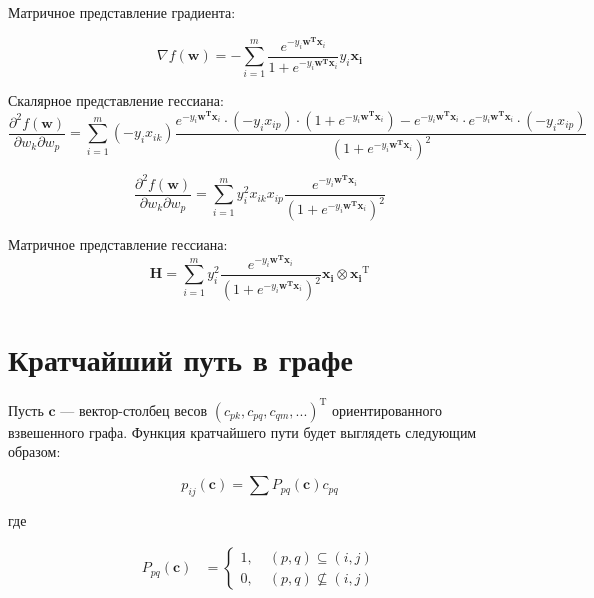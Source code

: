 	Матричное представление градиента:
	
	\begin{equation}
	\nabla f(\mathbf{w}) = - \sum\limits_{i=1}^m  \frac{e^{-y_i \mathbf{w^T
				x}_i}}{1+ e^{-y_i \mathbf{w^T x}_i}} y_i\mathbf{x_i}
	\end{equation}
	
	Скалярное представление гессиана:
	\begin{equation}
	\frac{\partial^2 f(\mathbf{w})}{\partial w_k \partial w_p} =
	\sum\limits_{i=1}^m (-y_i x_{ik})  \frac{e^{-y_i \mathbf{w^T x}_i}\cdot(-y_i
		x_{ip})\cdot(1+e^{-y_i \mathbf{w^T x}_i})-e^{-y_i \mathbf{w^T x}_i}\cdot e^{-y_i
			\mathbf{w^T x}_i}\cdot(-y_i x_{ip})}{(1+e^{-y_i \mathbf{w^T x}_i})^2} 
	\end{equation}
	
	\begin{equation}
	\frac{\partial^2 f(\mathbf{w})}{\partial w_k \partial w_p}= \sum\limits_{i=1}^m
	y_i^2 x_{ik} x_{ip} \frac{e^{-y_i \mathbf{w^T x}_i}}{(1+e^{-y_i \mathbf{w^T
				x}_i})^2}
	\end{equation}	
	
	Матричное представление гессиана:
	\begin{equation}
	\mathbf{H} = \sum\limits_{i=1}^m y_i^2  \frac{e^{-y_i \mathbf{w^T
				x}_i}}{(1+e^{-y_i \mathbf{w^T x}_i})^2} \mathbf{x_i} \otimes
	\mathbf{x_i}^\text{T}
	\end{equation}
	
	\section{Кратчайший путь в графе}
	
	Пусть $\mathbf{c}$ --- вектор-столбец весов $(c_{pk}, c_{pq}, c_{qm},
	...)^{\text{T}}$ ориентированного взвешенного графа. Функция кратчайшего пути
	будет выглядеть следующим образом:
	
	\begin{equation}
	p_{ij}(\mathbf{c}) = \sum P_{pq}(\mathbf{c}) c_{pq}
	\end{equation}
	
	где 
	
	
	\begin{align}
	P_{pq}(\mathbf{c}) &=
	\left\{
	\begin{aligned}
	1 ,\; & (p,q) \subseteq (i,j) \\
	0 ,\; & (p,q) \nsubseteq (i,j)
	\end{aligned}
	\right. \\
	\end{align}
	
